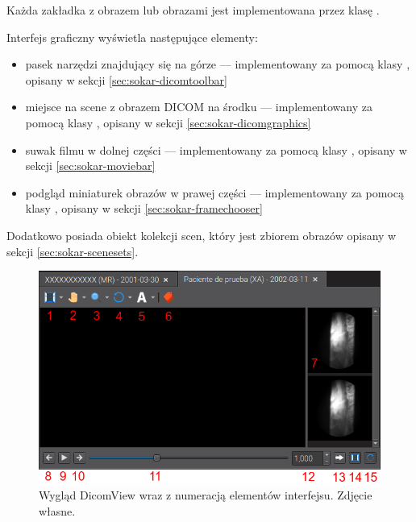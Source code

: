 \label{sec:sokar-dicomview}
\par
Każda zakładka z obrazem lub obrazami jest implementowana przez klasę .

\par
Interfejs graficzny  wyświetla następujące elementy:
\begin{itemize}
    \item pasek narzędzi znajdujący się na górze --- implementowany za pomocą klasy , opisany w sekcji \ref{sec:sokar-dicomtoolbar}
    \item miejsce na scene z obrazem DICOM na środku --- implementowany za pomocą klasy , opisany w sekcji \ref{sec:sokar-dicomgraphics}
    \item suwak filmu w dolnej części --- implementowany za pomocą klasy , opisany w sekcji \ref{sec:sokar-moviebar}
    \item podgląd miniaturek obrazów w prawej części --- implementowany za pomocą klasy , opisany w sekcji \ref{sec:sokar-framechooser}
\end{itemize}

\par
Dodatkowo posiada obiekt kolekcji scen, który jest zbiorem obrazów opisany w sekcji \ref{sec:sokar-scenesets}.

\begin{figure}[!htbp]
    \centering
    \includegraphics[width=\textwidth]{img/sokar-dicomview-001.png}
    \caption{Wygląd DicomView wraz z numeracją elementów interfejsu. Zdjęcie własne.}
    \label{fig:sokar-dicomview001}
\end{figure}

